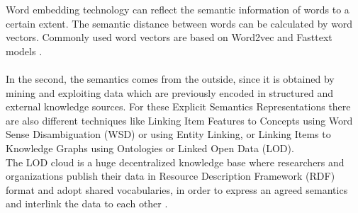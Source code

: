 \documentclass[\myFontSize,a4paper,oneside,english,hidelinks]{article}
\begin{document}
Word embedding technology can reflect the semantic information of words to a certain extent. The semantic distance between words can be calculated by word vectors. Commonly used word vectors are based on Word2vec and Fasttext models \cite{Huang2023}.\\\\
%
In the second, the semantics comes from the outside, since it is obtained by mining and exploiting data
which are previously encoded in structured and external knowledge sources. For these Explicit Semantics Representations there are also different techniques like Linking Item Features to Concepts using Word Sense Disambiguation (WSD) or using Entity Linking, or Linking Items to Knowledge Graphs using Ontologies or Linked Open Data (LOD). \cite{Musto2022251} \\
The LOD cloud is a huge decentralized knowledge base where researchers and organizations publish their data in Resource Description Framework (RDF) format and adopt shared vocabularies, in order to express an agreed semantics and interlink the data to each other \cite{Musto2017405}.\\
%
%
%
\end{document}
